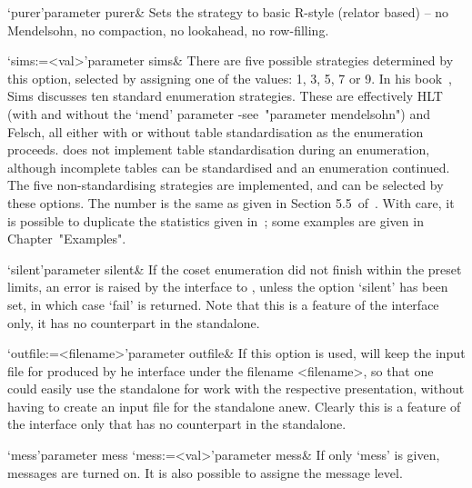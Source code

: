     \>`purer'{parameter purer}&
    Sets the strategy  to basic R-style (relator based)  -- no Mendelsohn,
    no compaction, no lookahead, no row-filling.

    \>`sims:=<val>'{parameter sims}&
    There are five possible strategies determined by this option, selected
by  assigning  one  of  the  values:   1,  3,  5,  7  or  9.   In  his
book~\cite{Sim94}, Sims discusses ten standard enumeration strategies.
These  are effectively  HLT  (with and  without  the `mend'  parameter
-see~"parameter mendelsohn")  and Felsch,  all either with  or without
table standardisation  as the  enumeration proceeds.  {\ACE}  does not
implement  table  standardisation   during  an  enumeration,  although
incomplete tables  can be  standardised and an  enumeration continued.
The  five non-standardising  strategies  are implemented,  and can  be
selected by these options.  The number is the same as given in Section
5.5~of~\cite{Sim94}.   With  care, it  is  possible  to duplicate  the
statistics   given   in~\cite{Sim};  some   examples   are  given   in
Chapter~"Examples".  %





\beginitems

\>`silent'{parameter silent}& 
If the coset  enumeration did not finish within  the preset limits, an
error is raised by the interface to {\GAP}, unless the option `silent'
has been set,  in which case `fail' is returned.  Note  that this is a
feature of  the {\GAP}  interface only, it  has no counterpart  in the
{\ACE} standalone.

\>`outfile:=<filename>'{parameter outfile}&
If this  option is used,  {\GAP} will keep  the input file  for {\ACE}
produced by he {\GAP} interface under the filename <filename>, so that
one  could  easily  use  the  {\ACE}  standalone  for  work  with  the
respective presentation,  without having to  create an input  file for
the standalone anew.  Clearly this is a feature  of the interface only
that has no counterpart in the {\ACE} standalone.

\>`mess'{parameter mess}
\>`mess:=<val>'{parameter mess}&
If only `mess' is given, messages are turned on. It is also possible to
assigne the message level.

